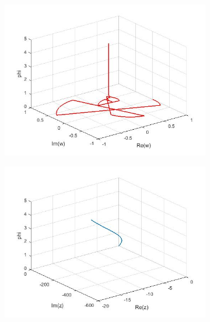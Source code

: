 \documentclass[a4paper,11pt]{article}
\begin{document}
\begin{figure}[!h]
\begin{subfigure}[c]{0.5\textwidth}
\end{subfigure}
\begin{subfigure}[c]{0.5\textwidth}
\includegraphics[width=\linewidth]{30.jpg}
\end{subfigure}
\begin{subfigure}[c]{0.5\textwidth}
\includegraphics[width=\linewidth]{35.jpg}
\end{subfigure}
\begin{subfigure}[c]{0.5\textwidth}

\end{subfigure}
\end{figure}
\end{document}
